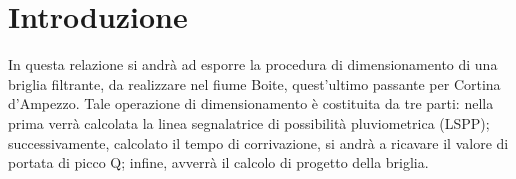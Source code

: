 \section{Introduzione}
In questa relazione si andrà ad esporre la procedura di dimensionamento di una briglia filtrante, da realizzare nel fiume Boite, quest'ultimo passante per Cortina d’Ampezzo.
Tale operazione di dimensionamento è costituita da tre parti: nella prima verrà calcolata la linea segnalatrice di possibilità pluviometrica (LSPP); successivamente, calcolato il tempo
di corrivazione, si andrà a ricavare il valore di portata di picco Q; infine, avverrà il calcolo di progetto della briglia.\\


 